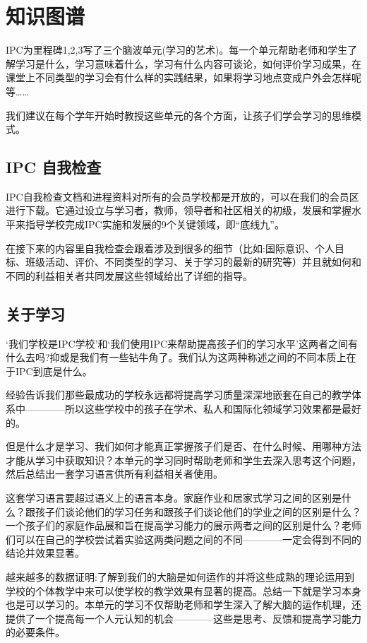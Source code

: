 \chapter{知识图谱}
    IPC为里程碑1,2,3写了三个脑波单元(学习的艺术)。每一个单元帮助老师和学生了解学习是什么，学习意味着什么，学习有什么内容可谈论，如何评价学习成果，在课堂上不同类型的学习会有什么样的实践结果，如果将学习地点变成户外会怎样呢等……
\par
    我们建议在每个学年开始时教授这些单元的各个方面，让孩子们学会学习的思维模式。\par
\section{IPC 自我检查}
    IPC自我检查文档和进程资料对所有的会员学校都是开放的，可以在我们的会员区进行下载。它通过设立与学习者，教师，领导者和社区相关的初级，发展和掌握水平来指导学校完成IPC实施和发展的9个关键领域，即“底线九”。\par
    在接下来的内容里自我检查会跟着涉及到很多的细节（比如:国际意识、个人目标、班级活动、评价、不同类型的学习、关于学习的最新的研究等）并且就如何和不同的利益相关者共同发展这些领域给出了详细的指导。

\section{关于学习}
    ‘我们学校是IPC学校’和‘我们使用IPC来帮助提高孩子们的学习水平’这两者之间有什么去吗?抑或是我们有一些钻牛角了。我们认为这两种称述之间的不同本质上在于IPC到底是什么。 \par
     经验告诉我们那些最成功的学校永远都将提高学习质量深深地嵌套在自己的教学体系中————所以这些学校中的孩子在学术、私人和国际化领域学习效果都是最好的。\par
     但是什么才是学习、我们如何才能真正掌握孩子们是否、在什么时候、用哪种方法才能从学习中获取知识？本单元的学习同时帮助老师和学生去深入思考这个问题，然后总结出一套学习语言供所有利益相关者使用。  \par
     这套学习语言要超过语义上的语言本身。家庭作业和居家式学习之间的区别是什么？跟孩子们谈论他们的学习任务和跟孩子们谈论他们的学业之间的区别是什么？一个孩子们的家庭作品展和旨在提高学习能力的展示两者之间的区别是什么？老师们可以在自己的学校尝试着实验这两类问题之间的不同————一定会得到不同的结论并效果显著。\par
     越来越多的数据证明:了解到我们的大脑是如何运作的并将这些成熟的理论运用到学校的个体教学中来可以使学校的教学效果有显著的提高。总结一下就是学习本身也是可以学习的。本单元的学习不仅帮助老师和学生深入了解大脑的运作机理，还提供了一个提高每一个人元认知的机会————这些是思考、反馈和提高学习能力的必要条件。 \par
 
